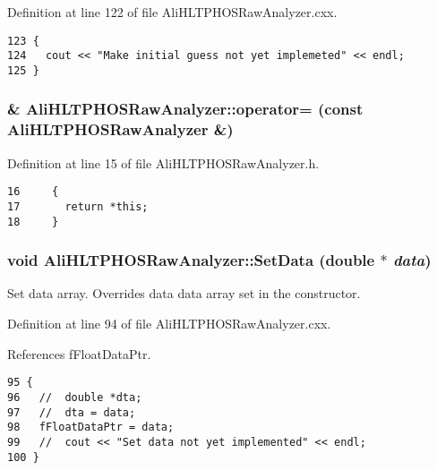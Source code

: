 Definition at line 122 of file Ali\-HLTPHOSRaw\-Analyzer.cxx.

\footnotesize\begin{verbatim}123 {
124   cout << "Make initial guess not yet implemeted" << endl;
125 }
\end{verbatim}\normalsize 


\subsubsection{\& Ali\-HLTPHOSRaw\-Analyzer::operator= (const {\bf Ali\-HLTPHOSRaw\-Analyzer} \&)\hspace{0.3cm}{\tt  [inline]}}\label{classAliHLTPHOSRawAnalyzer_AliHLTPHOSRawAnalyzera4}




Definition at line 15 of file Ali\-HLTPHOSRaw\-Analyzer.h.

\footnotesize\begin{verbatim}16     {
17       return *this;
18     }
\end{verbatim}\normalsize 


\subsubsection{\setlength{\rightskip}{0pt plus 5cm}void Ali\-HLTPHOSRaw\-Analyzer::Set\-Data (double $\ast$ {\em data})}\label{classAliHLTPHOSRawAnalyzer_AliHLTPHOSRawAnalyzerPeakFindera12}


Set data array. Overrides data data array set in the constructor. 

Definition at line 94 of file Ali\-HLTPHOSRaw\-Analyzer.cxx.

References f\-Float\-Data\-Ptr.

\footnotesize\begin{verbatim}95 {
96   //  double *dta;
97   //  dta = data;
98   fFloatDataPtr = data;
99   //  cout << "Set data not yet implemented" << endl;
100 }
\end{verbatim}\normalsize 


